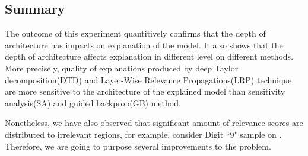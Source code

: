 
\subsection{Summary}
The outcome of this experiment quantitively confirms that the depth of architecture has impacts on explanation of the model. It also shows that  the depth of architecture affects explanation in different level on different methods. More precisely, quality of explanations produced by deep Taylor decomposition(DTD) and Layer-Wise Relevance Propagations(LRP) technique are more sensitive to the architecture of the explained model than sensitivity analysis(SA) and guided backprop(GB) method.

Nonetheless, we have also observed that significant amount of relevance scores are distributed to irrelevant regions, for example, consider Digit ``9" sample on \addfigure{\ref{fig:heatmap_msc_mix_for_thesis}}. Therefore, we are going to purpose several improvements to the problem.

